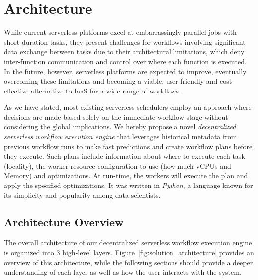 \documentclass[conference]{IEEEtran}
\begin{document}

\section{Architecture}
\label{s:architecture}

While current serverless platforms excel at embarrassingly parallel jobs with short-duration tasks, they present challenges for workflows involving significant data exchange between tasks due to their architectural limitations, which deny inter-function communication and control over where each function is executed. In the future, however, serverless platforms are expected to improve, eventually overcoming these limitations and becoming a viable, user-friendly and cost-effective alternative to IaaS for a wide range of workflows.

As we have stated, most existing serverless schedulers employ an approach where decisions are made based solely on the immediate workflow stage without considering the global implications. We hereby propose a novel \textit{decentralized serverless workflow execution engine} that leverages historical metadata from previous workflow runs to make fast predictions and create workflow plans before they execute. Such plans include information about where to execute each task (locality), the worker resource configuration to use (how much vCPUs and Memory) and optimizations. At run-time, the workers will execute the plan and apply the specified optimizations. It was written in \textit{Python}, a language known for its simplicity and popularity among data scientists.

\subsection{Architecture Overview}

The overall architecture of our decentralized serverless workflow execution engine is organized into 3 high-level layers. Figure~\ref{fig:solution_architecture} provides an overview of this architecture, while the following sections should provide a deeper understanding of each layer as well as how the user interacts with the system.
\end{document}
